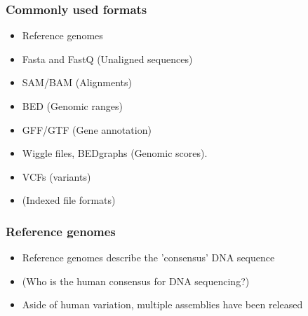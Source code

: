 \documentclass{beamer}
\begin{document}
\begin{frame}
  \frametitle{Commonly used formats}
  \begin{itemize}

  \item  Reference genomes

  \item  Fasta and FastQ (Unaligned sequences)
 
  \item SAM/BAM (Alignments)
 
  \item BED (Genomic ranges)
 
  \item GFF/GTF (Gene annotation)
 
  \item Wiggle files, BEDgraphs (Genomic scores).
 

  \item VCFs (variants)

  \item (Indexed file formats)


  \end{itemize}
\end{frame}


\begin{frame}
  \frametitle{Reference genomes}
  \begin{itemize}
  \item Reference genomes describe the 'consensus' DNA sequence 
  \item (Who is the human consensus for DNA sequencing?)
  \item Aside of human variation, multiple assemblies have been released
  \end{itemize}
\end{frame}





\end{document}
